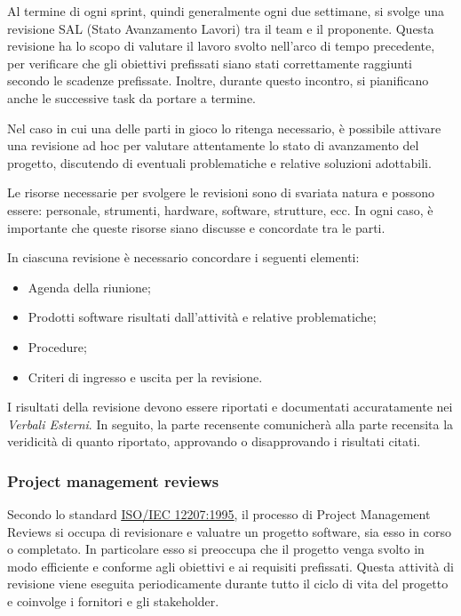 Al termine di ogni sprint, quindi generalmente ogni due settimane, si svolge una revisione SAL
(Stato Avanzamento Lavori) tra il team e il proponente. Questa revisione ha lo scopo di valutare il lavoro svolto
nell'arco di tempo precedente, per verificare che gli obiettivi prefissati siano stati correttamente raggiunti secondo le scadenze prefissate.
Inoltre, durante questo incontro, si pianificano anche le successive task da portare a termine.

Nel caso in cui una delle parti in gioco lo ritenga necessario, è possibile attivare una revisione ad hoc per valutare attentamente lo stato
di avanzamento del progetto, discutendo di eventuali problematiche e relative soluzioni adottabili.

Le risorse necessarie per svolgere le revisioni sono di svariata natura e possono essere: personale, strumenti, hardware, software, strutture, ecc.
In ogni caso, è importante che queste risorse siano discusse e concordate tra le parti.

In ciascuna revisione è necessario concordare i seguenti elementi:
\begin{itemize}
	\item Agenda della riunione;
	\item Prodotti software risultati dall'attività e relative problematiche;
	\item Procedure;
	\item Criteri di ingresso e uscita per la revisione.
\end{itemize}

I risultati della revisione devono essere riportati e documentati accuratamente nei \textit{Verbali Esterni}. In seguito, la parte recensente
comunicherà alla parte recensita la veridicità di quanto riportato, approvando o disapprovando i risultati citati.

\subsubsection{Project management reviews}
Secondo lo standard \href{https://www.math.unipd.it/~tullio/IS-1/2009/Approfondimenti/ISO_12207-1995.pdf}{\underline{ISO/IEC 12207:1995}},
il processo di Project Management Reviews si occupa di revisionare e valuatre un progetto software, sia esso
in corso o completato. In particolare esso si preoccupa che il progetto venga svolto in modo efficiente e conforme agli obiettivi e ai requisiti
prefissati. Questa attività di revisione viene eseguita periodicamente durante tutto il ciclo di vita del progetto e
coinvolge i fornitori e gli stakeholder.

